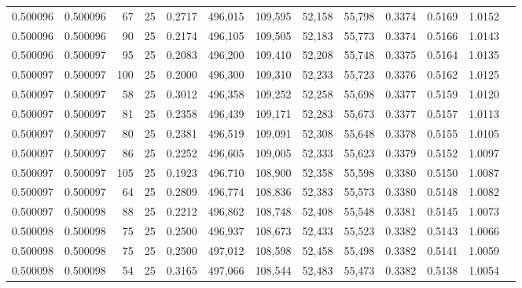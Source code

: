 \begin{tabular}{rrrrrrrrrrrrr}
0.500096 & 0.500096 &    67 &  25 &                                     0.2717 & 496,015 & 109,595 &  52,158 &  55,798 & 0.3374 & 0.5169 & 1.0152 \\
0.500096 & 0.500096 &    90 &  25 &                                     0.2174 & 496,105 & 109,505 &  52,183 &  55,773 & 0.3374 & 0.5166 & 1.0143 \\
0.500096 & 0.500097 &    95 &  25 &                                     0.2083 & 496,200 & 109,410 &  52,208 &  55,748 & 0.3375 & 0.5164 & 1.0135 \\
0.500097 & 0.500097 &   100 &  25 &                                     0.2000 & 496,300 & 109,310 &  52,233 &  55,723 & 0.3376 & 0.5162 & 1.0125 \\
0.500097 & 0.500097 &    58 &  25 &                                     0.3012 & 496,358 & 109,252 &  52,258 &  55,698 & 0.3377 & 0.5159 & 1.0120 \\
0.500097 & 0.500097 &    81 &  25 &                                     0.2358 & 496,439 & 109,171 &  52,283 &  55,673 & 0.3377 & 0.5157 & 1.0113 \\
0.500097 & 0.500097 &    80 &  25 &                                     0.2381 & 496,519 & 109,091 &  52,308 &  55,648 & 0.3378 & 0.5155 & 1.0105 \\
0.500097 & 0.500097 &    86 &  25 &                                     0.2252 & 496,605 & 109,005 &  52,333 &  55,623 & 0.3379 & 0.5152 & 1.0097 \\
0.500097 & 0.500097 &   105 &  25 &                                     0.1923 & 496,710 & 108,900 &  52,358 &  55,598 & 0.3380 & 0.5150 & 1.0087 \\
0.500097 & 0.500097 &    64 &  25 &                                     0.2809 & 496,774 & 108,836 &  52,383 &  55,573 & 0.3380 & 0.5148 & 1.0082 \\
0.500097 & 0.500098 &    88 &  25 &                                     0.2212 & 496,862 & 108,748 &  52,408 &  55,548 & 0.3381 & 0.5145 & 1.0073 \\
0.500098 & 0.500098 &    75 &  25 &                                     0.2500 & 496,937 & 108,673 &  52,433 &  55,523 & 0.3382 & 0.5143 & 1.0066 \\
0.500098 & 0.500098 &    75 &  25 &                                     0.2500 & 497,012 & 108,598 &  52,458 &  55,498 & 0.3382 & 0.5141 & 1.0059 \\
0.500098 & 0.500098 &    54 &  25 &                                     0.3165 & 497,066 & 108,544 &  52,483 &  55,473 & 0.3382 & 0.5138 & 1.0054 \\

\end{tabular}
